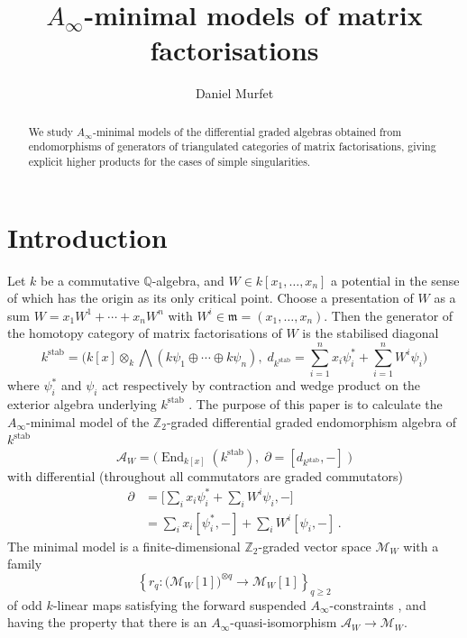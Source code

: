 \documentclass[english,letter paper,12pt,leqno]{article}
\theoremstyle{example}
\numberwithin{equation}{section}
\def\res{\operatorname{Res}}
\def\stab{\operatorname{stab}}
\def\be{\begin{equation}}
\def\ee{\end{equation}}
\def\nZ{\mathds{Z}}
\DeclareMathOperator{\End}{End}
\begin{document}
\def\Res{\res\!}
\newcommand{\ud}{\mathrm{d}}
\newcommand{\Ress}[1]{\res_{#1}\!}
\newcommand{\cat}[1]{\mathcal{#1}}
\newcommand{\lto}{\longrightarrow}
\newcommand{\xlto}[1]{\stackrel{#1}\lto}
\newcommand{\mf}[1]{\mathfrak{#1}}
\newcommand{\md}[1]{\mathscr{#1}}
\def\sus{\l}
\def\l{\,|\,}
\def\sgn{\textup{sgn}}

\title{$A_\infty$-minimal models of matrix factorisations}
\author{Daniel Murfet}

\maketitle

\begin{abstract}
We study $A_\infty$-minimal models of the differential graded algebras obtained from endomorphisms of generators of triangulated categories of matrix factorisations, giving explicit higher products for the cases of simple singularities. 
\end{abstract}

\section{Introduction}

Let $k$ be a commutative $\mathbb{Q}$-algebra, and $W \in k[x_1,\ldots,x_n]$ a potential in the sense of \cite[\S 2.2]{lgdual} which has the origin as its only critical point. Choose a presentation of $W$ as a sum $W = x_1 W^1 + \cdots + x_n W^n$ with $W^i \in \mf{m} = (x_1,\ldots,x_n)$. Then the generator of the homotopy category of matrix factorisations of $W$ is the stabilised diagonal
\begin{equation}\label{eq:kstab}
k^{\operatorname{stab}} = \Big( k[x] \otimes_k \bigwedge( k\psi_1 \oplus \cdots \oplus k \psi_n ), \;d_{k^{\stab}} = \sum_{i=1}^n x_i \psi_i^* + \sum_{i=1}^n W^i \psi_i \Big)
\end{equation}
where $\psi_i^*$ and $\psi_i$ act respectively by contraction and wedge product on the exterior algebra underlying $k^{\stab}$ \cite{d0904.4713}. The purpose of this paper is to calculate the $A_\infty$-minimal model of the $\nZ_2$-graded differential graded endomorphism algebra of $k^{\operatorname{\stab}}$
\be\label{eq:defnaw}
\md{A}_W = \Big( \End_{k[x]}(k^{\operatorname{stab}}), \; \partial = [d_{k^{\stab}},-] \; \Big)
\ee 
with differential (throughout all commutators are graded commutators)
\begin{align}
\partial &= \Big[\sum_i x_i \psi_i^* + \sum_i W^i \psi_i, -\Big]\\
&= \sum_i x_i [\psi_i^*,-] + \sum_i W^i [\psi_i,-]\,.
\end{align}
The minimal model is a finite-dimensional $\nZ_2$-graded vector space $\md{M}_W$ with a family 
\[
\left\{ r_q: \big(\md{M}_W[1]\big)^{\otimes q} \lto \md{M}_W[1] \right\}_{q \ge 2}
\]
of odd $k$-linear maps satisfying the forward suspended $A_\infty$-constraints \cite{lazaroiu}, and having the property that there is an $A_\infty$-quasi-isomorphism $\md{A}_W \lto \md{M}_W$.
\end{document}
